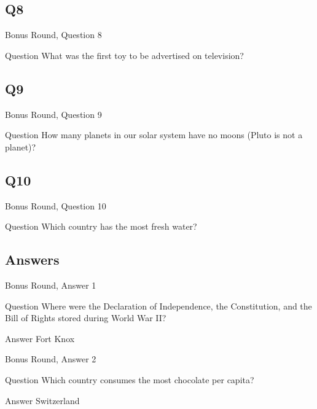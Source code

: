 \documentclass[11pt]{beamer}
\begin{document}
\subsection*{Q8}
\begin{frame}[t]{Bonus Round, Question 8}
\vspace{2em}
\begin{block}{Question}
What was the first toy to be advertised on television\@?
\end{block}
\end{frame}
    

\subsection*{Q9}
\begin{frame}[t]{Bonus Round, Question 9}
\vspace{2em}
\begin{block}{Question}
How many planets in our solar system have no moons (Pluto is not a planet)\@?
\end{block}
\end{frame}
    

\subsection*{Q10}
\begin{frame}[t]{Bonus Round, Question 10}
\vspace{2em}
\begin{block}{Question}
Which country has the most fresh water\@?
\end{block}
\end{frame}
    
\subsection{Answers}

\begin{frame}[t]{Bonus Round, Answer 1}
\vspace{2em}
\begin{block}{Question}
Where were the Declaration of Independence, the Constitution, and the Bill of Rights stored during World War II\@?
\end{block}
\pause{}
\begin{block}{Answer}
Fort Knox
\end{block}
\end{frame}
    

\begin{frame}[t]{Bonus Round, Answer 2}
\vspace{2em}
\begin{block}{Question}
Which country consumes the most chocolate per capita\@?
\end{block}
\pause{}
\begin{block}{Answer}
Switzerland
\end{block}
\end{frame}
    
\end{document}
